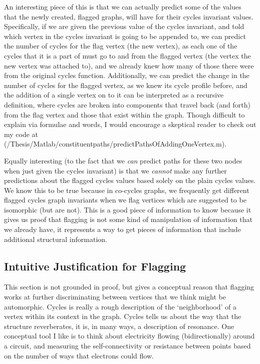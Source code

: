 An interesting piece of this is that we can actually predict some of the values that the newly created, flagged graphs, will have for their cycles invariant values.
Specifically, if we are given the previous value of the cycles invariant, and told which vertex in the cycles invariant is going to be appended to, we can predict the number of cycles for the flag vertex (the new vertex), as each one of the cycles that it is a part of must go to and from the flagged vertex (the vertex the new vertex was attached to), and we already knew how many of those there were from the original cycles function.
Additionally, we can predict the change in the number of cycles for the flagged vertex, as we knew its cycle profile before, and the addition of a single vertex on to it can be interpreted as a recursive definition, where cycles are broken into components that travel back (and forth) from the flag vertex and those that exist within the graph.
Though difficult to explain via formulae and words, I would encourage a skeptical reader to check out my code at (/Thesis/Matlab/constituentpaths/predictPathsOfAddingOneVertex.m).

Equally interesting (to the fact that we \emph{can} predict paths for these two nodes when just given the cycles invariant) is that we \emph{cannot} make any further predictions about the flagged cycles values based solely on the plain cycles values.
We know this to be true because in co-cycles graphs, we frequently get different flagged cycles graph invariants when we flag vertices which are suggested to be isomorphic (but are not).
This is a good piece of information to know because it gives us proof that flagging is not some kind of manipulation of information that we already have, it represents a way to get pieces of information that include additional structural information.

\subsection{Intuitive Justification for Flagging}

This section is not grounded in proof, but gives a conceptual reason that flagging works at further discriminating between vertices that we think might be automorphic.
Cycles is really a rough description of the `neighborhood' of a vertex within its context in the graph.
Cycles tells us about the way that the structure reverberates, it is, in many ways, a description of resonance.
One conceptual tool I like is to think about electricity flowing (bidirectionally) around a circuit, and measuring the self-connectivity or resistance between points based on the number of ways that electrons could flow.

